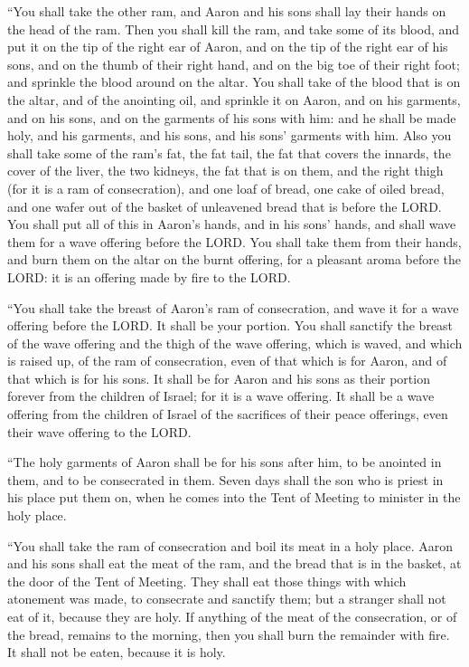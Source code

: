  ``You shall take the other ram, and Aaron and his sons
shall lay their hands on the head of the ram.  Then you
shall kill the ram, and take some of its blood, and put it on the tip of
the right ear of Aaron, and on the tip of the right ear of his sons, and
on the thumb of their right hand, and on the big toe of their right
foot; and sprinkle the blood around on the altar.  You
shall take of the blood that is on the altar, and of the anointing oil,
and sprinkle it on Aaron, and on his garments, and on his sons, and on
the garments of his sons with him: and he shall be made holy, and his
garments, and his sons, and his sons' garments with him. 
Also you shall take some of the ram's fat, the fat tail, the fat that
covers the innards, the cover of the liver, the two kidneys, the fat
that is on them, and the right thigh (for it is a ram of consecration),
 and one loaf of bread, one cake of oiled bread, and one
wafer out of the basket of unleavened bread that is before the LORD.
 You shall put all of this in Aaron's hands, and in his
sons' hands, and shall wave them for a wave offering before the LORD.
 You shall take them from their hands, and burn them on
the altar on the burnt offering, for a pleasant aroma before the LORD:
it is an offering made by fire to the LORD.

 ``You shall take the breast of Aaron's ram of
consecration, and wave it for a wave offering before the LORD. It shall
be your portion.  You shall sanctify the breast of the
wave offering and the thigh of the wave offering, which is waved, and
which is raised up, of the ram of consecration, even of that which is
for Aaron, and of that which is for his sons.  It shall
be for Aaron and his sons as their portion forever from the children of
Israel; for it is a wave offering. It shall be a wave offering from the
children of Israel of the sacrifices of their peace offerings, even
their wave offering to the LORD.

 ``The holy garments of Aaron shall be for his sons after
him, to be anointed in them, and to be consecrated in them.
 Seven days shall the son who is priest in his place put
them on, when he comes into the Tent of Meeting to minister in the holy
place.

 ``You shall take the ram of consecration and boil its
meat in a holy place.  Aaron and his sons shall eat the
meat of the ram, and the bread that is in the basket, at the door of the
Tent of Meeting.  They shall eat those things with which
atonement was made, to consecrate and sanctify them; but a stranger
shall not eat of it, because they are holy.  If anything
of the meat of the consecration, or of the bread, remains to the
morning, then you shall burn the remainder with fire. It shall not be
eaten, because it is holy.

